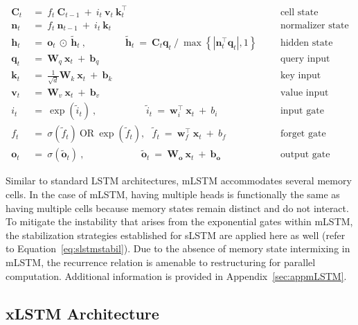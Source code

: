 \begin{align}
\label{eq:mlstm_recurrent_begin}
\mathbf{C}_t \ &= \  f_t \ \mathbf{C}_{t-1} \ + \ 
  i_t \ \mathbf{v}_t \ \mathbf{k}_t^\top & &  &\text{cell state} \\
\mathbf{n}_t \ &= \  f_t \ \mathbf{n}_{t-1} \ + \ 
  i_t \ \mathbf{k}_t & &  &\text{normalizer state} \\
\mathbf{h}_t  \ &= \ \mathbf{o}_t \ \odot \ \tilde{\mathbf{h}}_t
\ , \qquad \qquad 
\tilde{\mathbf{h}}_t \ = \   \mathbf{C}_t \mathbf{q}_t \ / \ 
  \max \left\{ |\mathbf{n}_t^\top \mathbf{q}_t|, 1 \right\} 
   &&&\text{hidden state} \\
\mathbf{q}_t \ &= \ \mathbf{W}_q \ \mathbf{x}_t \ + \ \mathbf{b}_q  & &  &\text{query input} \\
\mathbf{k}_t \ &= \ \frac{1}{\sqrt{d}} \mathbf{W}_k \ \mathbf{x}_t \ + \ \mathbf{b}_k  & &  &\text{key input} \\
\mathbf{v}_t \ &= \ \mathbf{W}_v \ \mathbf{x}_t \ + \ \mathbf{b}_v  & &  &\text{value input} \\
i_t \ &= \ \!\exp \!  \! \left( \tilde{i}_t  \right) \ , 
 \qquad \qquad \ \ \ \ \,
  \tilde{i}_t \ = \ \mathbf{w}^\top_{i} \ \mathbf{x}_t \ + \  b_{i} \ \ \ 
  &&&\text{input gate} \\
f_t \ &= \ \sigma \!  \left(  \tilde{f}_t \right) \ \text{OR} \ \!\exp \!  \! \left(  \tilde{f}_t \right) , \ \ \: \!
\tilde{f}_t \ = \ \mathbf{w}^\top_{f} \ \mathbf{x}_t  \ + \
  b_{f}
  &&& \text{forget gate} \\
\label{eq:mlstm_recurrent_end}
\mathbf{o}_t \ &= \ \sigma \left( \tilde{\mathbf{o}}_t \right) \ , \qquad \qquad \quad \ \ \ \,
  \tilde{\mathbf{o}}_t  \ = \ \mathbf{W}_{\mathbf{o}} \ \mathbf{x}_t \ + \
  \mathbf{b}_{\mathbf{o}}
  &&&\text{output gate} 
\end{align}

Similar to standard LSTM architectures, mLSTM accommodates several memory cells. In the case of mLSTM, having multiple heads is functionally the same as having multiple cells because memory states remain distinct and do not interact. To mitigate the instability that arises from the exponential gates within mLSTM, the stabilization strategies established for sLSTM are applied here as well (refer to Equation~\ref{eq:slstmstabil}). Due to the absence of memory state intermixing in mLSTM, the recurrence relation is amenable to restructuring for parallel computation. Additional information is provided in Appendix~\ref{sec:appmLSTM}.

\subsection{xLSTM Architecture}
\label{sec:xLSTMarch}

